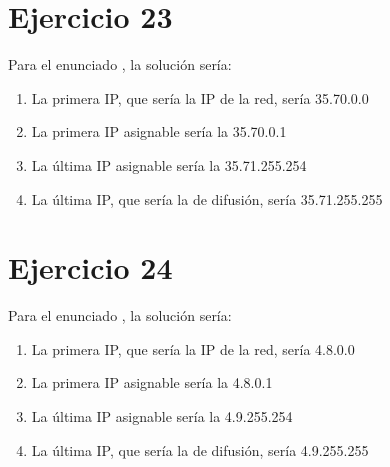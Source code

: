 \documentclass[letterpaper,10pt,spanish]{sphinxmanual}
\begin{document}
\section{Ejercicio 23}
\label{\detokenize{t2_integracion_elementos/ejercicios_subredes_ipv4/rangos_direcciones:id23}}
\sphinxAtStartPar
Para el enunciado , la solución sería:
\begin{enumerate}
%
\item {} 
\sphinxAtStartPar
La primera IP, que sería la IP de la red, sería 35.70.0.0

\item {} 
\sphinxAtStartPar
La primera IP asignable sería la 35.70.0.1

\item {} 
\sphinxAtStartPar
La última IP asignable sería la 35.71.255.254

\item {} 
\sphinxAtStartPar
La última IP, que sería la de difusión, sería 35.71.255.255

\end{enumerate}


\section{Ejercicio 24}
\label{\detokenize{t2_integracion_elementos/ejercicios_subredes_ipv4/rangos_direcciones:id24}}
\sphinxAtStartPar
Para el enunciado , la solución sería:
\begin{enumerate}
%
\item {} 
\sphinxAtStartPar
La primera IP, que sería la IP de la red, sería 4.8.0.0

\item {} 
\sphinxAtStartPar
La primera IP asignable sería la 4.8.0.1

\item {} 
\sphinxAtStartPar
La última IP asignable sería la 4.9.255.254

\item {} 
\sphinxAtStartPar
La última IP, que sería la de difusión, sería 4.9.255.255

\end{enumerate}
\end{document}
